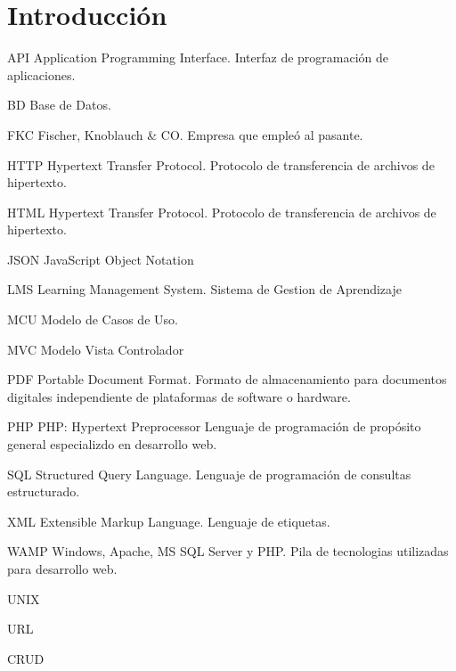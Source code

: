 \chapter*{Introducción}
\thispagestyle{empty} %

API
Application Programming Interface. Interfaz de programación de aplicaciones.

BD
Base de Datos.

FKC
Fischer, Knoblauch \& CO. Empresa que empleó al pasante.

HTTP
Hypertext Transfer Protocol. Protocolo de transferencia de archivos de hipertexto.

HTML
Hypertext Transfer Protocol. Protocolo de transferencia de archivos de hipertexto.

JSON
JavaScript Object Notation

LMS
Learning Management System. Sistema de Gestion de Aprendizaje

MCU
Modelo de Casos de Uso.

MVC
Modelo Vista Controlador

PDF Portable Document Format. 
Formato de almacenamiento para documentos digitales independiente de plataformas de software o hardware.

PHP 
PHP: Hypertext Preprocessor
Lenguaje de programación de propósito general especializdo en desarrollo web.

SQL
Structured Query Language. Lenguaje de programación de consultas estructurado.

XML
Extensible Markup Language. Lenguaje de etiquetas.

WAMP
Windows, Apache, MS SQL Server y PHP. Pila de tecnologias utilizadas para desarrollo web.

UNIX

URL

CRUD